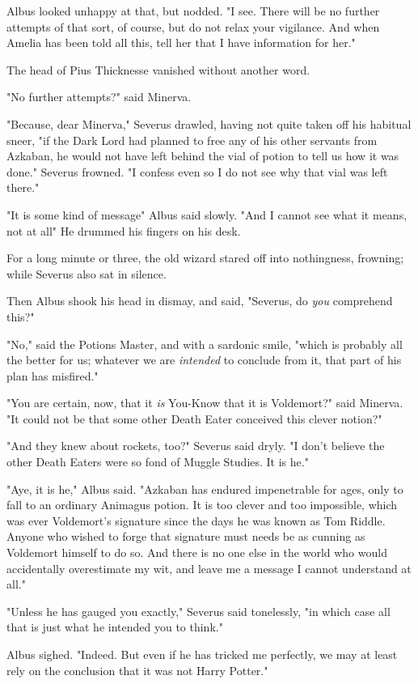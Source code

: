 Albus looked unhappy at that, but nodded. "I see. There will be no further
attempts of that sort, of course, but do not relax your vigilance. And when
Amelia has been told all this, tell her that I have information for her."

The head of Pius Thicknesse vanished without another word.

"No further attempts\el?" said Minerva.

"Because, dear Minerva," Severus drawled, having not quite taken off his
habitual sneer, "if the Dark Lord had planned to free any of his other servants
from Azkaban, he would not have left behind the vial of potion to tell us how
it was done." Severus frowned. "I confess{\el} even so I do not see why that
vial was left there."

"It is some kind of message{\el}" Albus said slowly. "And I cannot see what
it means, not at all{\el}" He drummed his fingers on his desk.

For a long minute or three, the old wizard stared off into nothingness,
frowning; while Severus also sat in silence.

Then Albus shook his head in dismay, and said, "Severus, do \emph{you}
comprehend this?"

"No," said the Potions Master, and with a sardonic smile, "which is probably
all the better for us; whatever we are \emph{intended} to conclude from it,
that part of his plan has misfired."

"You are certain, now, that it \emph{is} You-Know{\el} that it is
Voldemort?" said Minerva. "It could not be that some other Death Eater
conceived this clever notion?"

"And they knew about rockets, too?" Severus said dryly. "I don't believe the
other Death Eaters were so fond of Muggle Studies. It is he."

"Aye, it is he," Albus said. "Azkaban has endured impenetrable for ages, only
to fall to an ordinary Animagus potion. It is too clever and too impossible,
which was ever Voldemort's signature since the days he was known as Tom Riddle.
Anyone who wished to forge that signature must needs be as cunning as Voldemort
himself to do so. And there is no one else in the world who would accidentally
overestimate my wit, and leave me a message I cannot understand at all."

"Unless he has gauged you exactly," Severus said tonelessly, "in which case all
that is just what he intended you to think."

Albus sighed. "Indeed. But even if he has tricked me perfectly, we may at least
rely on the conclusion that it was not Harry Potter."

